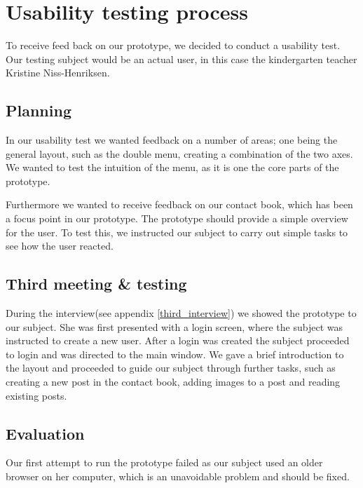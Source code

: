 \section{Usability testing process}
To receive feed back on our prototype, we decided to conduct a usability test. Our testing subject would be an actual user, in this case the kindergarten teacher Kristine Niss-Henriksen.
\subsection{Planning}

In our usability test we wanted feedback on a number of areas; one being the general layout, such as the double menu, creating a combination of the two axes. We wanted to test the intuition of the menu, as it is one the core parts of the prototype. 
 
Furthermore we wanted to receive feedback on our contact book, which has been a focus point in our prototype. The prototype should provide a simple overview for the user. To test this, we instructed our subject to carry out simple tasks to see how the user reacted.


\subsection{Third meeting \& testing}

During the interview(see appendix \vref{third_interview}) we showed the prototype to our subject. She was first presented with a login screen, where the subject was instructed to create a new user. After a login was created the subject proceeded to login and was directed to the main window. We gave a brief introduction to the layout and proceeded to guide our subject through further tasks, such as creating a new post in the contact book, adding images to a post and reading existing posts. 


\subsection{Evaluation}
Our first attempt to run the prototype failed as our subject used an older browser on her computer, which is an unavoidable problem and should be fixed.


